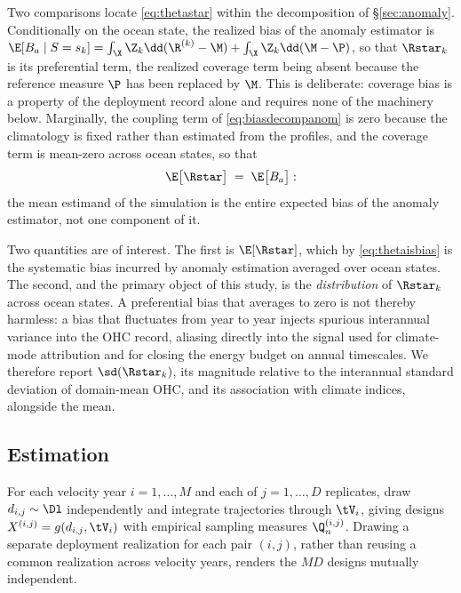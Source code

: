 Two comparisons locate \eqref{eq:thetastar} within the decomposition of
\S\ref{sec:anomaly}. Conditionally on the ocean state, the realized bias of the
anomaly estimator is
$\E[B_a \mid S = s_k] = \int_\X \Z_k \dd(\R^{(k)} - \M) + \int_\X \Z_k \dd(\M - \P)$,
so that $\Rstar_k$ is its preferential term, the realized coverage term being
absent because the reference measure $\P$ has been replaced by $\M$. This is
deliberate: coverage bias is a property of the deployment record alone and
requires none of the machinery below. Marginally, the coupling term of
\eqref{eq:biasdecompanom} is zero because the climatology is fixed rather than
estimated from the profiles, and the coverage term is mean-zero across ocean
states, so that
\begin{equation}
  \label{eq:thetaisbias}
  \E\big[\Rstar\big] \;=\; \E\big[B_a\big] :
\end{equation}
the mean estimand of the simulation is the entire expected bias of the anomaly
estimator, not one component of it.

Two quantities are of interest. The first is $\E[\Rstar]$, which by
\eqref{eq:thetaisbias} is the systematic bias incurred by anomaly estimation
averaged over ocean states. The second, and the primary object of this study, is
the \emph{distribution} of $\Rstar_k$ across ocean states. A preferential bias
that averages to zero is not thereby harmless: a bias that fluctuates from year
to year injects spurious interannual variance into the OHC record, aliasing
directly into the signal used for climate-mode attribution and for closing the
energy budget on annual timescales. We therefore report $\sd(\Rstar_k)$, its
magnitude relative to the interannual standard deviation of domain-mean OHC, and
its association with climate indices, alongside the mean.

\subsection{Estimation}

For each velocity year $i = 1,\ldots,M$ and each of $j = 1,\ldots,D$ replicates,
draw $d_{i,j} \sim \Dl$ independently and integrate trajectories through
$\tV_i$, giving designs $X^{(i,j)} = g(d_{i,j}, \tV_i)$ with empirical sampling
measures $\Q_n^{(i,j)}$. Drawing a separate deployment realization for each pair
$(i,j)$, rather than reusing a common realization across velocity years, renders
the $MD$ designs mutually independent.

